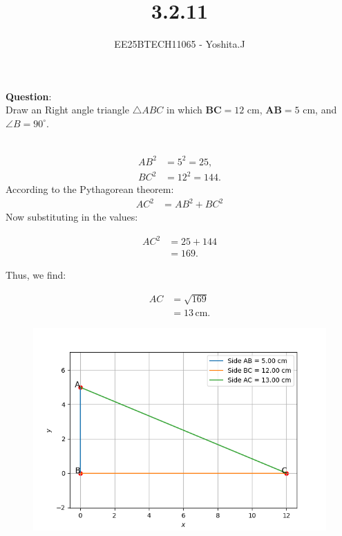 \documentclass[journal]{IEEEtran}
\begin{document}

\vspace{3cm}

\title{3.2.11}
\author{EE25BTECH11065 - Yoshita.J}
{\let\newpage\relax\maketitle}

\renewcommand{\thefigure}{\theenumi}
\renewcommand{\thetable}{\theenumi}
\setlength{\intextsep}{10pt} %


\renewcommand{\thetable}{\theenumi}


\textbf{Question}:\\
Draw an Right angle  triangle $\triangle ABC$ in which $\boldsymbol{BC} = 12 \text{ cm}$, $\boldsymbol{AB} = 5 \text{ cm}$, and $\angle B = 90^\circ$.
\\ \solution \\
    \begin{table}[h!]    
      \centering
      
      \caption{}
    \end{table}
   \begin{align}
      AB^2 & = 5^2 = 25, \\
      BC^2 & = 12^2 = 144.
   \end{align}
According to the Pythagorean theorem:
   \begin{align}
      AC^2 & = AB^2 + BC^2 
   \end{align}
Now substituting in the values:

   \begin{align}
      AC^2 & = 25 + 144 \\
      & = 169.
   \end{align}

Thus, we find:

   \begin{align}
      AC & = \sqrt{169} \\
      & = 13 \, \text{cm}.
   \end{align}
    \begin{figure}[h]
       \centering
       \includegraphics[width=0.9\columnwidth]{figs/fig1.png}
       \caption{}
       \label{graph}
    \end{figure}
\end{document}
